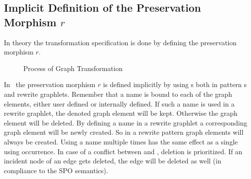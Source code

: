 \subsection{Implicit Definition of the Preservation Morphism $r$}
\label{rule:morphismr}
In theory the transformation specification is done by defining the preservation morphism $r$.
\begin{figure}[htbp]
	\centering
  \caption{Process of Graph Transformation}
  \label{rule:figrule}
\end{figure}
In \GrG\, the preservation morphism $r$ is defined implicitly by using s both in pattern s and rewrite graphlets.
Remember that a name is bound to each of the graph elements, either user defined or internally defined. If such a name is used in a rewrite graphlet, the denoted graph element will be kept.
Otherwise the graph element will be deleted.
By defining a name in a rewrite graphlet a corresponding graph element will be newly created.
So in a rewrite pattern  graph elements will always be created.
Using a name multiple times has the same effect as a single using occurrence.
In case of a conflict between  and , deletion is prioritized.
If an incident node of an edge gets deleted, the edge will be deleted as well (in compliance to the SPO semantics).


